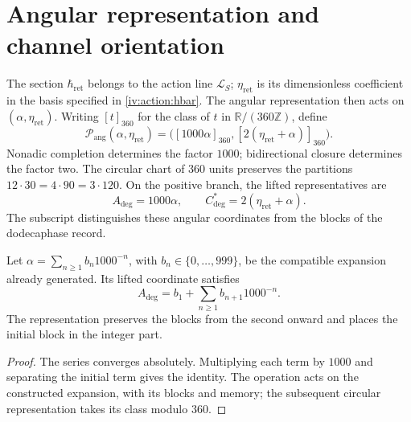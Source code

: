 \section{Angular representation and channel orientation}
\label{iv:angular:section}

The section \(\hbar_{\mathrm{ret}}\) belongs to the action
line \(\mathcal L_S\); \(\eta_{\mathrm{ret}}\) is its
dimensionless coefficient in the basis specified in
\eqref{iv:action:hbar}. The angular representation then acts
on \((\alpha,\eta_{\mathrm{ret}})\). Writing
\([t]_{360}\) for the class of \(t\) in
\(\mathbb R/(360\mathbb Z)\), define
\begin{equation}
 \mathcal P_{\mathrm{ang}}(\alpha,\eta_{\mathrm{ret}})
 =\bigl([1000\alpha]_{360},
        [2(\eta_{\mathrm{ret}}+\alpha)]_{360}\bigr).
 \label{iv:angular:publicacion}
\end{equation}
Nonadic completion determines the factor \(1000\);
bidirectional closure determines the factor two. The circular
chart of \(360\) units preserves the partitions
\(12\cdot30=4\cdot90=3\cdot120\). On the positive branch, the
lifted representatives are
\begin{equation}
 A_{\deg}=1000\alpha,\qquad
 C^*_{\deg}=2(\eta_{\mathrm{ret}}+\alpha).
 \label{iv:angular:representantes}
\end{equation}
The subscript distinguishes these angular coordinates from the blocks
of the dodecaphase record.

\begin{proposition}
\label{iv:angular:desplazamiento}
Let \(\alpha=\sum_{n\geq1}b_n1000^{-n}\), with
\(b_n\in\{0,\ldots,999\}\), be the compatible expansion already
generated. Its lifted coordinate satisfies
\[
 A_{\deg}=b_1+\sum_{n\geq1}b_{n+1}1000^{-n}.
\]
The representation preserves the blocks from the second onward and
places the initial block in the integer part.
\end{proposition}
\begin{proof}
The series converges absolutely. Multiplying each term by
\(1000\) and separating the initial term gives the identity.
The operation acts on the constructed expansion, with its
blocks and memory; the subsequent circular representation takes
its class modulo \(360\).
\end{proof}

